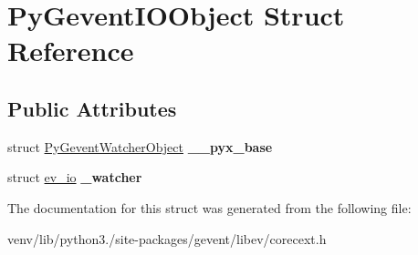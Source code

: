 \hypertarget{struct_py_gevent_i_o_object}{}\section{Py\+Gevent\+I\+O\+Object Struct Reference}
\label{struct_py_gevent_i_o_object}
\subsection*{Public Attributes}
\begin{DoxyCompactItemize}
\item 
\mbox{\label{struct_py_gevent_i_o_object_a5d0fc35c43fe8c36da2425a922471a8c}} 
struct \hyperlink{struct_py_gevent_watcher_object}{Py\+Gevent\+Watcher\+Object} {\bfseries \+\_\+\+\_\+pyx\+\_\+base}
\item 
\mbox{\label{struct_py_gevent_i_o_object_a0fa7530693ffb21e42165982356345b1}} 
struct \hyperlink{structev__io}{ev\+\_\+io} {\bfseries \+\_\+watcher}
\end{DoxyCompactItemize}


The documentation for this struct was generated from the following file\+:\begin{DoxyCompactItemize}
\item 
venv/lib/python3./site-\/packages/gevent/libev/corecext.\+h\end{DoxyCompactItemize}
